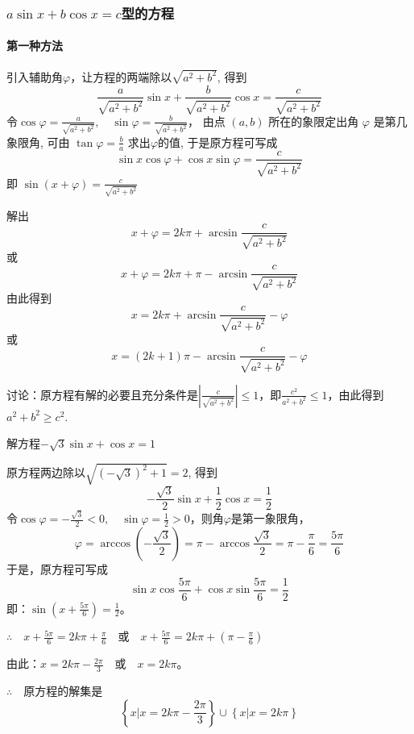 \subsubsection{$a\sin x +b\cos x=c$型的方程}

\paragraph{第一种方法} 引入辅助角$\varphi$，让方程的两端除以$\sqrt{a^2+b^2}$, 得到
\[\frac{a}{\sqrt{a^{2}+b^{2}}} \sin x+\frac{b}{\sqrt{a^{2}+b^{2}}} \cos x=\frac{c}{\sqrt{a^{2}+b^{2}}}\]
令$\cos \varphi=\frac{a}{\sqrt{a^{2}+b^{2}}}, \quad \sin \varphi=\frac{b}{\sqrt{a^{2}+b^{2}}}$，
由点 $(a, b)$ 所在的象限定出角 $\varphi$ 是第几象限角, 可由 
$\tan \varphi=\frac{b}{a}$ 求出$\varphi$的值, 于是原方程可写成
\[\sin x \cos \varphi+\cos x \sin \varphi=\frac{c}{\sqrt{a^{2}+b^{2}}}\]
即 $\sin (x+\varphi)=\frac{c}{\sqrt{a^{2}+b^{2}}}$

解出 
\begin{equation}
    x+\varphi=2 k \pi+\arcsin \frac{c}{\sqrt{a^{2}+b^{2}}}
\end{equation}
或
\begin{equation}
    x+\varphi=2 k \pi+\pi-\arcsin \frac{c}{\sqrt{a^{2}+b^{2}}}
\end{equation}
由此得到
\[x=2 k \pi+\arcsin \frac{c}{\sqrt{a^{2}+b^{2}}}-\varphi\]
或
\[x=(2 k+1) \pi-\arcsin \frac{c}{\sqrt{a^{2}+b^{2}}}-\varphi\]

讨论：原方程有解的必要且充分条件是$\left| \frac{c}{\sqrt{a^{2}+b^{2}}}\right|\le 1$，即$\frac{c^2}{a^2+b^2}\le 1$，由此得到
$a^2+b^2\ge c^2$.

\begin{example}
    解方程$-\sqrt{3}\sin x+\cos x=1$
\end{example}

\begin{solution}
    原方程两边除以$\sqrt{(-\sqrt{3})^2+1}=2$, 得到
\[-\frac{\sqrt{3}}{2}\sin x+\frac{1}{2}\cos x=\frac{1}{2}\]
令$\cos\varphi=-\frac{\sqrt{3}}{2}<0,\quad \sin\varphi=\frac{1}{2}>0$，则角$\varphi$是第一象限角，
\[\varphi=\arccos\left(-\frac{\sqrt{3}}{2}\right)=\pi-\arccos\frac{\sqrt{3}}{2}=\pi-\frac{\pi}{6}=\frac{5\pi}{6}\]
于是，原方程可写成
\[\sin x\cos\frac{5\pi}{6}+\cos x\sin \frac{5\pi}{6}=\frac{1}{2}\]
即：$\sin\left(x+\frac{5\pi}{6}\right)=\frac{1}{2}$。

$\therefore\quad x+\frac{5\pi}{6}=2k\pi+\frac{\pi}{6}\quad \text{或}\quad x+\frac{5\pi}{6}=2k\pi+\left(\pi-\frac{\pi}{6}\right)$

由此：$x=2k\pi-\frac{2\pi}{3}\quad \text{或}\quad x=2k\pi$。

$\therefore\quad $原方程的解集是
\[\left\{x\big|x=2k\pi-\frac{2\pi}{3}\right\}\cup \left\{x\big|x=2k\pi\right\}\]
\end{solution}

